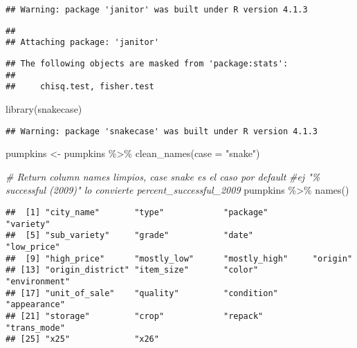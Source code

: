\documentclass[
]{article}
\newenvironment{Shaded}{\begin{snugshade}}{\end{snugshade}}
\newcommand{\AttributeTok}[1]{\textcolor[rgb]{0.77,0.63,0.00}{#1}}
\newcommand{\CommentTok}[1]{\textcolor[rgb]{0.56,0.35,0.01}{\textit{#1}}}
\newcommand{\FunctionTok}[1]{\textcolor[rgb]{0.00,0.00,0.00}{#1}}
\newcommand{\NormalTok}[1]{#1}
\newcommand{\OtherTok}[1]{\textcolor[rgb]{0.56,0.35,0.01}{#1}}
\newcommand{\SpecialCharTok}[1]{\textcolor[rgb]{0.00,0.00,0.00}{#1}}
\newcommand{\StringTok}[1]{\textcolor[rgb]{0.31,0.60,0.02}{#1}}
\begin{document}
\begin{verbatim}
## Warning: package 'janitor' was built under R version 4.1.3
\end{verbatim}

\begin{verbatim}
## 
## Attaching package: 'janitor'
\end{verbatim}

\begin{verbatim}
## The following objects are masked from 'package:stats':
## 
##     chisq.test, fisher.test
\end{verbatim}

\begin{Shaded}
\begin{Highlighting}[]
\FunctionTok{library}\NormalTok{(snakecase)}
\end{Highlighting}
\end{Shaded}

\begin{verbatim}
## Warning: package 'snakecase' was built under R version 4.1.3
\end{verbatim}

\begin{Shaded}
\begin{Highlighting}[]
\NormalTok{pumpkins }\OtherTok{\textless{}{-}}\NormalTok{ pumpkins }\SpecialCharTok{\%\textgreater{}\%} 
  \FunctionTok{clean\_names}\NormalTok{(}\AttributeTok{case =} \StringTok{"snake"}\NormalTok{)}

\CommentTok{\# Return column names limpios, case snake es el caso por default}
\CommentTok{\#ej "\% successful (2009)" lo convierte percent\_successful\_2009}
\NormalTok{pumpkins }\SpecialCharTok{\%\textgreater{}\%} 
  \FunctionTok{names}\NormalTok{()}
\end{Highlighting}
\end{Shaded}

\begin{verbatim}
##  [1] "city_name"       "type"            "package"         "variety"        
##  [5] "sub_variety"     "grade"           "date"            "low_price"      
##  [9] "high_price"      "mostly_low"      "mostly_high"     "origin"         
## [13] "origin_district" "item_size"       "color"           "environment"    
## [17] "unit_of_sale"    "quality"         "condition"       "appearance"     
## [21] "storage"         "crop"            "repack"          "trans_mode"     
## [25] "x25"             "x26"
\end{verbatim}
\end{document}
